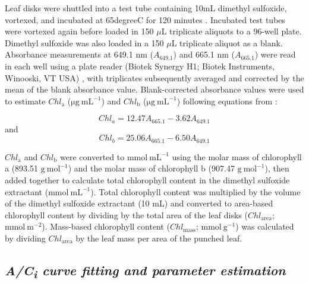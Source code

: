 Leaf disks were shuttled into a test tube containing 10mL dimethyl sulfoxide, vortexed, and incubated at 65\text degree{}C for 120 minutes . Incubated test tubes were vortexed again before loaded in 150 $\mu$L triplicate aliquots to a 96-well plate. Dimethyl sulfoxide was also loaded in a 150 $\mu$L triplicate aliquot as a blank. Absorbance measurements at 649.1 nm ($A_{649.1}$) and 665.1 nm ($A_{665.1}$) were read in each well using a plate reader (Biotek Synergy H1; Biotek Instruments, Winooski, VT USA) , with triplicates subsequently averaged and corrected by the mean of the blank absorbance value. Blank-corrected absorbance values were used to estimate $Chl_\mathrm{a}$ ($\mathrm{\mu g\ mL^{-1}}$) and $Chl_\mathrm{b}$ ($\mathrm{\mu g\ mL^{-1}}$) following equations from :

\begin{equation} \label{eq_5.1}
    Chl_{a}=12.47A_{665.1}-3.62A_{649.1}
\end{equation}
\noindent and
\begin{equation} \label{eq_5.2}
    Chl_{b}=25.06A_{665.1}-6.50A_{649.1}
\end{equation}
    
\noindent $Chl_\mathrm{a}$ and $Chl_\mathrm{b}$ were converted to $\mathrm{mmol\ mL^{-1}}$ using the molar mass of chlorophyll a (893.51 $\mathrm{g\ mol^{-1}}$) and the molar mass of chlorophyll b (907.47 $\mathrm{g\ mol^{-1}}$), then added together to calculate total chlorophyll content in the dimethyl sulfoxide extractant ($\mathrm{mmol\ mL^{-1}}$). Total chlorophyll content was multiplied by the volume of the dimethyl sulfoxide extractant (10 mL) and converted to area-based chlorophyll content by dividing by the total area of the leaf disks ($Chl_\mathrm{area}$; $\mathrm{mmol\ m^{-2}}$). Mass-based chlorophyll content ($Chl_\mathrm{mass}$; $\mathrm{mmol\ g^{-1}}$) was calculated by dividing $Chl_\mathrm{area}$ by the leaf mass per area of the punched leaf.

\subsection{\textit{A/C\textsubscript{i} curve fitting and parameter estimation}}


